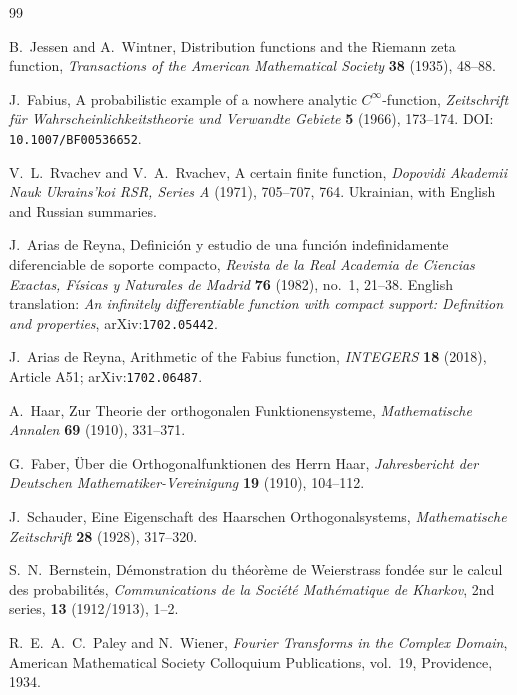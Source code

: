 \documentclass[11pt,oneside]{article}
\theoremstyle{definition}
\begin{document}
\begin{thebibliography}{99}

B.~Jessen and A.~Wintner,
\newblock Distribution functions and the Riemann zeta function,
\newblock \emph{Transactions of the American Mathematical Society}
  \textbf{38} (1935), 48--88.

J.~Fabius,
\newblock A probabilistic example of a nowhere analytic $C^\infty$-function,
\newblock \emph{Zeitschrift für Wahrscheinlichkeitstheorie und Verwandte Gebiete}
  \textbf{5} (1966), 173--174.
\newblock DOI: \nolinkurl{10.1007/BF00536652}.

V.~L.~Rvachev and V.~A.~Rvachev,
\newblock A certain finite function,
\newblock \emph{Dopovidi Akademii Nauk Ukrains'koi RSR, Series A}
  (1971), 705--707, 764.  Ukrainian, with English and Russian summaries.

J.~Arias de Reyna,
\newblock Definición y estudio de una función indefinidamente diferenciable de
  soporte compacto,
\newblock \emph{Revista de la Real Academia de Ciencias Exactas, Físicas y
  Naturales de Madrid} \textbf{76} (1982), no.~1, 21--38.
\newblock English translation: \emph{An infinitely differentiable function
  with compact support: Definition and properties}, arXiv:\nolinkurl{1702.05442}.

J.~Arias de Reyna,
\newblock Arithmetic of the Fabius function,
\newblock \emph{INTEGERS} \textbf{18} (2018), Article A51;
  arXiv:\nolinkurl{1702.06487}.

A.~Haar,
\newblock Zur Theorie der orthogonalen Funktionensysteme,
\newblock \emph{Mathematische Annalen} \textbf{69} (1910), 331--371.

G.~Faber,
\newblock Über die Orthogonalfunktionen des Herrn Haar,
\newblock \emph{Jahresbericht der Deutschen Mathematiker-Vereinigung}
  \textbf{19} (1910), 104--112.

J.~Schauder,
\newblock Eine Eigenschaft des Haarschen Orthogonalsystems,
\newblock \emph{Mathematische Zeitschrift} \textbf{28} (1928), 317--320.

S.~N.~Bernstein,
\newblock Démonstration du théorème de Weierstrass fondée sur le calcul des
  probabilités,
\newblock \emph{Communications de la Société Mathématique de Kharkov},
  2nd series, \textbf{13} (1912/1913), 1--2.

R.~E.~A.~C.~Paley and N.~Wiener,
\newblock \emph{Fourier Transforms in the Complex Domain},
\newblock American Mathematical Society Colloquium Publications, vol.~19,
  Providence, 1934.


\end{thebibliography}
\end{document}
